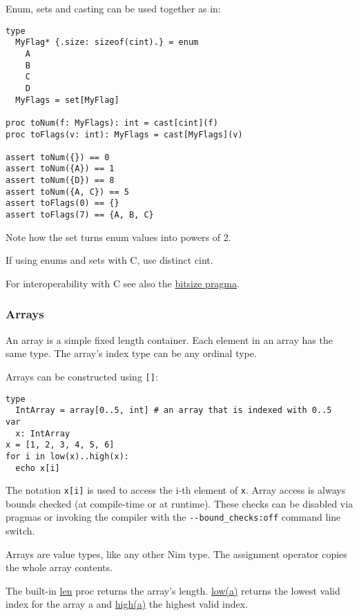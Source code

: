 Enum, sets and casting can be used together as in:

\begin{verbatim}
type
  MyFlag* {.size: sizeof(cint).} = enum
    A
    B
    C
    D
  MyFlags = set[MyFlag]

proc toNum(f: MyFlags): int = cast[cint](f)
proc toFlags(v: int): MyFlags = cast[MyFlags](v)

assert toNum({}) == 0
assert toNum({A}) == 1
assert toNum({D}) == 8
assert toNum({A, C}) == 5
assert toFlags(0) == {}
assert toFlags(7) == {A, B, C}
\end{verbatim}

Note how the set turns enum values into powers of 2.

If using enums and sets with C, use distinct cint.

For interoperability with C see also the
\href{manual.html\#implementation-specific-pragmas-bitsize-pragma}{bitsize
pragma}.

\hypertarget{arrays}{%
\subsubsection{Arrays}\label{arrays}}

An array is a simple fixed length container. Each element in an array
has the same type. The array's index type can be any ordinal type.

Arrays can be constructed using \texttt{{[}{]}}:

\begin{verbatim}
type
  IntArray = array[0..5, int] # an array that is indexed with 0..5
var
  x: IntArray
x = [1, 2, 3, 4, 5, 6]
for i in low(x)..high(x):
  echo x[i]
\end{verbatim}

The notation \texttt{x{[}i{]}} is used to access the i-th element of
\texttt{x}. Array access is always bounds checked (at compile-time or at
runtime). These checks can be disabled via pragmas or invoking the
compiler with the \texttt{-\/-bound\_checks:off} command line switch.

Arrays are value types, like any other Nim type. The assignment operator
copies the whole array contents.

The built-in \href{system.html\#len,TOpenArray}{len} proc returns the
array's length. \href{system.html\#low,openArray\%5BT\%5D}{low(a)}
returns the lowest valid index for the array {a} and
\href{system.html\#high,openArray\%5BT\%5D}{high(a)} the highest valid
index.

